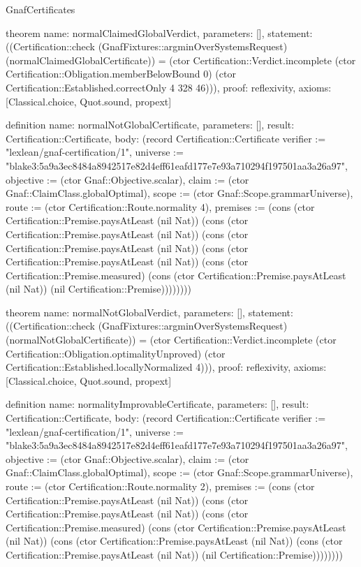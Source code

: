 \begin{lexlean}{GnafCertificates}
\begin{semanticmodule}
theorem{
  name: normalClaimedGlobalVerdict,
  parameters: [],
  statement: ((Certification::check (GnafFixtures::argminOverSystemsRequest) (normalClaimedGlobalCertificate)) = (ctor Certification::Verdict.incomplete (ctor Certification::Obligation.memberBelowBound 0) (ctor Certification::Established.correctOnly 4 328 46))),
  proof: reflexivity{},
  axioms: [Classical.choice, Quot.sound, propext]
}

definition{
  name: normalNotGlobalCertificate,
  parameters: [],
  result: Certification::Certificate,
  body: (record Certification::Certificate {verifier := "lexlean/gnaf-certification/1", universe := "blake3:5a9a3ec8484a8942517e82d4eff61eafd177e7e93a710294f197501aa3a26a97", objective := (ctor Gnaf::Objective.scalar), claim := (ctor Gnaf::ClaimClass.globalOptimal), scope := (ctor Gnaf::Scope.grammarUniverse), route := (ctor Certification::Route.normality 4), premises := (cons (ctor Certification::Premise.paysAtLeast (nil Nat)) (cons (ctor Certification::Premise.paysAtLeast (nil Nat)) (cons (ctor Certification::Premise.paysAtLeast (nil Nat)) (cons (ctor Certification::Premise.paysAtLeast (nil Nat)) (cons (ctor Certification::Premise.measured) (cons (ctor Certification::Premise.paysAtLeast (nil Nat)) (nil Certification::Premise)))))))})
}

theorem{
  name: normalNotGlobalVerdict,
  parameters: [],
  statement: ((Certification::check (GnafFixtures::argminOverSystemsRequest) (normalNotGlobalCertificate)) = (ctor Certification::Verdict.incomplete (ctor Certification::Obligation.optimalityUnproved) (ctor Certification::Established.locallyNormalized 4))),
  proof: reflexivity{},
  axioms: [Classical.choice, Quot.sound, propext]
}

definition{
  name: normalityImprovableCertificate,
  parameters: [],
  result: Certification::Certificate,
  body: (record Certification::Certificate {verifier := "lexlean/gnaf-certification/1", universe := "blake3:5a9a3ec8484a8942517e82d4eff61eafd177e7e93a710294f197501aa3a26a97", objective := (ctor Gnaf::Objective.scalar), claim := (ctor Gnaf::ClaimClass.globalOptimal), scope := (ctor Gnaf::Scope.grammarUniverse), route := (ctor Certification::Route.normality 2), premises := (cons (ctor Certification::Premise.paysAtLeast (nil Nat)) (cons (ctor Certification::Premise.paysAtLeast (nil Nat)) (cons (ctor Certification::Premise.measured) (cons (ctor Certification::Premise.paysAtLeast (nil Nat)) (cons (ctor Certification::Premise.paysAtLeast (nil Nat)) (cons (ctor Certification::Premise.paysAtLeast (nil Nat)) (nil Certification::Premise)))))))})
}


\end{semanticmodule}
\end{lexlean}

